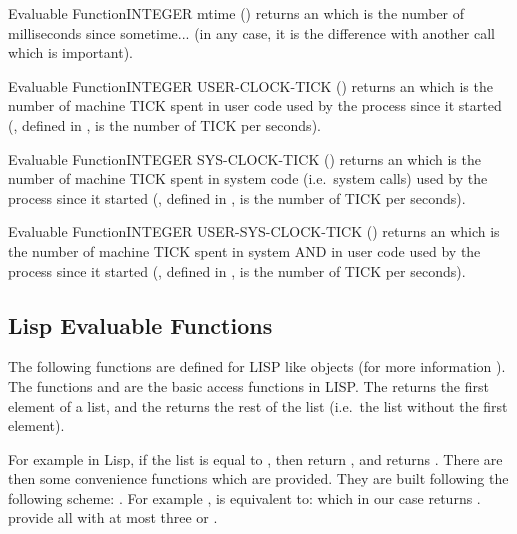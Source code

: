 \begin{typeefa}{Evaluable Function}{INTEGER} {mtime} {()}
returns an  which is the number of milliseconds since sometime...
(in any case, it is the difference with another call which is important).
\end{typeefa}

\begin{typeefa}{Evaluable Function}{INTEGER} {USER-CLOCK-TICK} {()}
returns an  which is the number of machine TICK spent in user
code used by the \COPRS{} process since it started (, defined in
, is the number of TICK per seconds).
\end{typeefa}

\begin{typeefa}{Evaluable Function}{INTEGER} {SYS-CLOCK-TICK} {()}
returns an  which is the number of machine TICK spent in system
code (i.e.\ system calls) used by the \COPRS{} process since it started
(, defined in , is the number of TICK per seconds).
\end{typeefa}

\begin{typeefa}{Evaluable Function}{INTEGER} {USER-SYS-CLOCK-TICK} {()}
returns an  which is the number of machine TICK spent in system
AND in user code used by the \COPRS{} process since it started (,
defined in , is the number of TICK per seconds).
\end{typeefa}

\subsection{Lisp Evaluable Functions}

The following functions are defined for LISP like objects (for more information
). The functions  and 
are  the basic access functions in LISP. The  returns the first
element of a list, and the  returns the rest of the list (i.e.\ the
list without the first element).

For example in Lisp, if the list  is equal to , then
 return , and  returns . There
are then some convenience functions which are provided. They are built following
the following scheme: . For example , is
equivalent to:  which in our case returns .
\COPRS{} provide all  with at most three  or .

